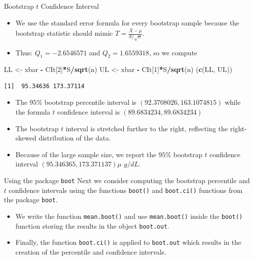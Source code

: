 \documentclass[
  ignorenonframetext,
]{beamer}
\newenvironment{Shaded}{\begin{snugshade}}{\end{snugshade}}
\newcommand{\DecValTok}[1]{\textcolor[rgb]{0.00,0.00,0.81}{#1}}
\newcommand{\FunctionTok}[1]{\textcolor[rgb]{0.13,0.29,0.53}{\textbf{#1}}}
\newcommand{\NormalTok}[1]{#1}
\newcommand{\OtherTok}[1]{\textcolor[rgb]{0.56,0.35,0.01}{#1}}
\newcommand{\SpecialCharTok}[1]{\textcolor[rgb]{0.81,0.36,0.00}{\textbf{#1}}}
\begin{document}
\begin{frame}[fragile]{Bootstrap \(t\) Confidence Interval}
\protect\hypertarget{bootstrap-t-confidence-interval-10}{}
\begin{itemize}
\item
  We use the standard error formula for every bootstrap sample because
  the bootstrap statistic should mimic
  \(T=\frac{\bar{X}-\mu}{S/\sqrt{n}}\).
\item
  Thus: \(Q_1=-2.6546571\) and \(Q_2=1.6559318\), so we compute
\end{itemize}

\small

\begin{Shaded}
\begin{Highlighting}[]
\NormalTok{LL }\OtherTok{\textless{}{-}}\NormalTok{ xbar }\SpecialCharTok{{-}}\NormalTok{ CIt[}\DecValTok{2}\NormalTok{]}\SpecialCharTok{*}\NormalTok{S}\SpecialCharTok{/}\FunctionTok{sqrt}\NormalTok{(n)}
\NormalTok{UL }\OtherTok{\textless{}{-}}\NormalTok{ xbar }\SpecialCharTok{{-}}\NormalTok{ CIt[}\DecValTok{1}\NormalTok{]}\SpecialCharTok{*}\NormalTok{S}\SpecialCharTok{/}\FunctionTok{sqrt}\NormalTok{(n)}
\NormalTok{(}\FunctionTok{c}\NormalTok{(LL, UL))}
\end{Highlighting}
\end{Shaded}

\begin{verbatim}
[1]  95.34636 173.37114
\end{verbatim}

\normalsize

\begin{itemize}
\item
  The \(95\%\) bootstrap percentile interval is
  \((92.3708026, 163.1074815)\) while the formula \(t\) confidence
  interval is \((89.6834234, 89.6834234)\)
\item
  The bootstrap \(t\) interval is stretched further to the right,
  reflecting the right-skewed distribution of the data.
\item
  Because of the large sample size, we report the \(95\%\) bootstrap
  \(t\) confidence interval \((95.346365, 173.371137)\mu\) \(g/dL\).
\end{itemize}
\end{frame}

\begin{frame}[fragile]{Using the package \texttt{boot}}
\protect\hypertarget{using-the-package-boot}{}
Next we consider computing the bootstrap percentile and \(t\) confidence
intervals using the functions \texttt{boot()} and \texttt{boot.ci()}
functions from the package \texttt{boot}.

\begin{itemize}
\item
  We write the function \texttt{mean.boot()} and use
  \texttt{mean.boot()} inside the \texttt{boot()} function storing the
  results in the object \texttt{boot.out}.
\item
  Finally, the function \texttt{boot.ci()} is applied to
  \texttt{boot.out} which results in the creation of the percentile and
  confidence intervals.
\end{itemize}
\end{frame}
\end{document}
